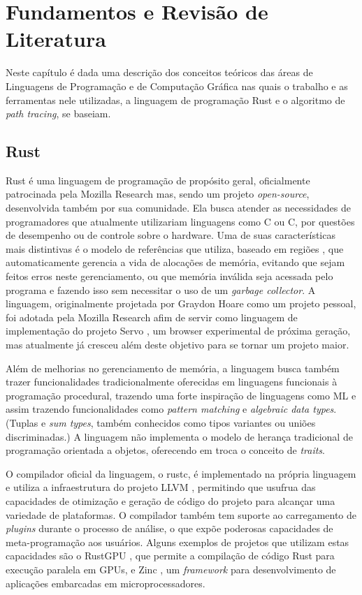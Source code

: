 \documentclass[tg]{mdtufsm}
\def\Cpp{{C\nolinebreak[4]\raisebox{.20ex}{\small\bf++}}}
\begin{document}
\chapter{Fundamentos e Revisão de Literatura}

Neste capítulo é dada uma descrição dos conceitos teóricos das áreas de Linguagens de Programação e de Computação Gráfica nas quais o trabalho e as ferramentas nele utilizadas, a linguagem de programação Rust e o algoritmo de \emph{path tracing}, se baseiam.

\section{Rust}

Rust \citep{rust} é uma linguagem de programação de propósito geral, oficialmente patrocinada pela
Mozilla Research mas, sendo um projeto \emph{open-source}, desenvolvida também por sua comunidade. Ela busca atender as necessidades
de programadores que atualmente utilizariam linguagens como C ou
\Cpp, por questões de desempenho ou de controle sobre o hardware. Uma de suas características mais
distintivas é o modelo de referências que utiliza, baseado em regiões \citep{grossman2002}, que
automaticamente gerencia a vida de alocações de memória, evitando que sejam feitos erros neste
gerenciamento, ou que memória inválida seja acessada pelo programa e fazendo isso sem necessitar o uso de um
\emph{garbage collector}. A linguagem, originalmente projetada por Graydon Hoare como um projeto
pessoal, foi adotada pela Mozilla Research afim de servir como linguagem de
implementação do projeto Servo \citep{servo}, um browser experimental de próxima geração, mas
atualmente já cresceu além deste objetivo para se tornar um projeto maior.

Além de melhorias no gerenciamento de memória, a linguagem busca também trazer funcionalidades
tradicionalmente oferecidas em linguagens funcionais à programação procedural, trazendo uma forte inspiração de linguagens
como ML \citep{milner1997} e assim trazendo funcionalidades como \emph{pattern matching} e \emph{algebraic data types}. (Tuplas e \emph{sum types}, também conhecidos como tipos variantes ou uniões discriminadas.) A linguagem não implementa o modelo de herança tradicional de programação orientada a objetos,
oferecendo em troca o conceito de \emph{traits}.

O compilador oficial da linguagem, o rustc, é implementado na própria linguagem e utiliza a
infraestrutura do projeto LLVM \citep{lattner2004}, permitindo que usufrua das capacidades de
otimização e geração de código do projeto para alcançar uma variedade de plataformas. O compilador
também tem suporte ao carregamento de \emph{plugins} durante o processo de análise, o que expõe
poderosas capacidades de meta-programação aos usuários. Alguns exemplos de projetos que utilizam
estas capacidades são o RustGPU \citep{holk2013}, que permite a compilação de código Rust para
execução paralela em GPUs, e Zinc \citep{zinc}, um \emph{framework} para desenvolvimento de
aplicações embarcadas em microprocessadores.
\end{document}
